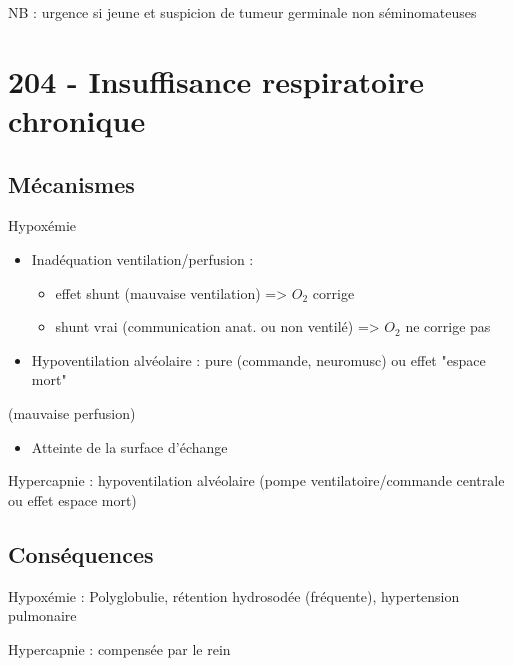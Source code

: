 NB : urgence si jeune et suspicion de tumeur germinale non séminomateuses

\section{204 - Insuffisance respiratoire chronique}
\label{sec:org6d633b6}
\subsection{Mécanismes}
\label{sec:org47f478d}
Hypoxémie
\begin{itemize}
\item Inadéquation ventilation/perfusion :
  \begin{itemize}
  \item effet shunt (mauvaise ventilation) => $O_2$ corrige
  \item shunt vrai (communication anat. ou non ventilé) => $O_2$ ne corrige
  pas
  \end{itemize}
\item Hypoventilation alvéolaire : pure (commande, neuromusc) ou effet "espace mort"
\end{itemize}
(mauvaise perfusion)
\begin{itemize}
\item Atteinte de la surface d'échange
\end{itemize}
Hypercapnie : hypoventilation alvéolaire (pompe ventilatoire/commande centrale
ou effet espace mort)

\subsection{Conséquences}
\label{sec:orgf6b3986}
Hypoxémie : Polyglobulie, rétention hydrosodée (fréquente), hypertension pulmonaire

Hypercapnie : compensée par le rein

